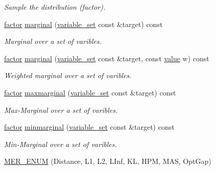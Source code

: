 \begin{DoxyCompactItemize}
\begin{DoxyCompactList}\small\item\em Sample the distribution (factor). \end{DoxyCompactList}\item 
\hyperlink{classmerlin_1_1factor}{factor} \hyperlink{classmerlin_1_1factor_ac857d47b1c1574a65baf5f19572db17b}{marginal} (\hyperlink{classmerlin_1_1variable__set}{variable\+\_\+set} const \&target) const 
\begin{DoxyCompactList}\small\item\em Marginal over a set of varibles. \end{DoxyCompactList}\item 
\hyperlink{classmerlin_1_1factor}{factor} \hyperlink{classmerlin_1_1factor_ab2f2a0ce290bcb53368c29707629f8b5}{marginal} (\hyperlink{classmerlin_1_1variable__set}{variable\+\_\+set} const \&target, const \hyperlink{classmerlin_1_1factor_a1b14d19e509403448fbef26b003c9281}{value} w) const 
\begin{DoxyCompactList}\small\item\em Weighted marginal over a set of varibles. \end{DoxyCompactList}\item 
\hyperlink{classmerlin_1_1factor}{factor} \hyperlink{classmerlin_1_1factor_a9e99845815dc5f2ddf48a4e23db67b66}{maxmarginal} (\hyperlink{classmerlin_1_1variable__set}{variable\+\_\+set} const \&target) const 
\begin{DoxyCompactList}\small\item\em Max-\/\+Marginal over a set of varibles. \end{DoxyCompactList}\item 
\hyperlink{classmerlin_1_1factor}{factor} \hyperlink{classmerlin_1_1factor_a6e34c8aac434508af856f23f8abece83}{minmarginal} (\hyperlink{classmerlin_1_1variable__set}{variable\+\_\+set} const \&target) const 
\begin{DoxyCompactList}\small\item\em Min-\/\+Marginal over a set of varibles. \end{DoxyCompactList}\item 
\hyperlink{classmerlin_1_1factor_a0b3fa98e1358652570e3926eca0d14d3}{M\+E\+R\+\_\+\+E\+N\+UM} (Distance, L1, L2, L\+Inf, KL, H\+PM, M\+AS, Opt\+Gap)\hypertarget{classmerlin_1_1factor_a0b3fa98e1358652570e3926eca0d14d3}{}\label{classmerlin_1_1factor_a0b3fa98e1358652570e3926eca0d14d3}


\end{DoxyCompactItemize}
